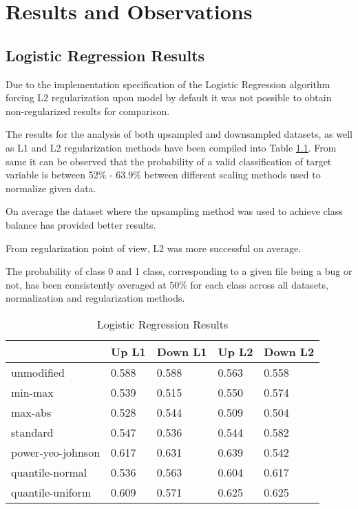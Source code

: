 \chapter{Results and Observations}\label{chp:results-and-observations}
\section{Logistic Regression Results}\label{sec:results:log-reg}

Due to the implementation specification of the Logistic Regression algorithm forcing L2 regularization upon model by default it was not possible to obtain non-regularized results for comparison.

The results for the analysis of both upsampled and downsampled datasets, as well as L1 and L2 regularization methods have been compiled into Table \ref{tbl:results:log-reg}. From same it can be observed that the probability of a valid classification of \isBug{} target variable is between 52\% - 63.9\% between different scaling methods used to normalize given data.

On average the dataset where the upsampling method was used to achieve class balance has provided better results. 

From regularization point of view, L2 was more successful on average.

The probability of class 0 and 1 class, corresponding to a given file being a bug or not, has been consistently averaged at 50\% for each class across all datasets, normalization and regularization methods. 
\begin{table}[h!]
\centering
\caption{Logistic Regression Results}
\label{tbl:results:log-reg}
\begin{tabular}{@{}lllll@{}}
\toprule
 & Up L1 & Down L1 & Up L2 & Down L2 \\ \midrule
unmodified & 0.588 & 0.588 & 0.563 & 0.558 \\
min-max & 0.539 & 0.515 & 0.550 & 0.574 \\
max-abs & 0.528 & 0.544 & 0.509 & 0.504 \\
standard & 0.547 & 0.536 & 0.544 & 0.582 \\
power-yeo-johnson & 0.617 & 0.631 & 0.639 & 0.542 \\
quantile-normal & 0.536 & 0.563 & 0.604 & 0.617 \\
quantile-uniform & 0.609 & 0.571 & 0.625 & 0.625 \\ \bottomrule
\end{tabular}
\end{table}

